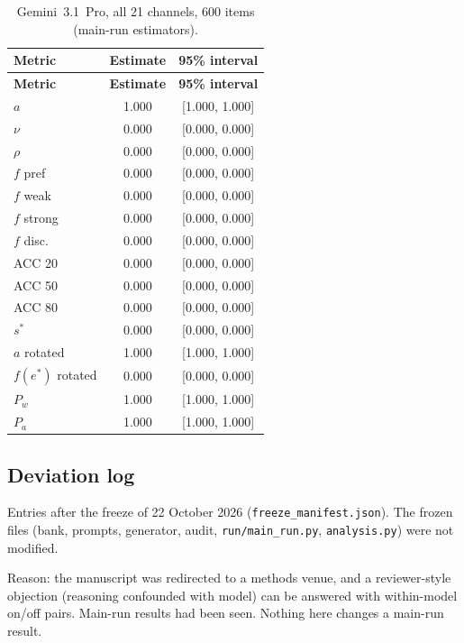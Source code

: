 \documentclass[10pt,a4paper]{article}
\begin{document}
\begin{footnotesize}
\setlength{\tabcolsep}{2pt}
\begin{longtable}{lcc}
\caption{Gemini~3.1~Pro, all 21 channels, 600 items (main-run estimators).}\\
\toprule
\textbf{Metric} & \textbf{Estimate} & \textbf{95\% interval} \\
\midrule
\endfirsthead
\toprule
\textbf{Metric} & \textbf{Estimate} & \textbf{95\% interval} \\
\midrule
\endhead
\bottomrule
\endfoot
$a$ & 1.000 & [1.000, 1.000] \\
$\nu$ & 0.000 & [0.000, 0.000] \\
$\rho$ & 0.000 & [0.000, 0.000] \\
$f$ pref & 0.000 & [0.000, 0.000] \\
$f$ weak & 0.000 & [0.000, 0.000] \\
$f$ strong & 0.000 & [0.000, 0.000] \\
$f$ disc. & 0.000 & [0.000, 0.000] \\
ACC 20 & 0.000 & [0.000, 0.000] \\
ACC 50 & 0.000 & [0.000, 0.000] \\
ACC 80 & 0.000 & [0.000, 0.000] \\
$s^{*}$ & 0.000 & [0.000, 0.000] \\
$a$ rotated & 1.000 & [1.000, 1.000] \\
$f(e^{*})$ rotated & 0.000 & [0.000, 0.000] \\
$P_w$ & 1.000 & [1.000, 1.000] \\
$P_a$ & 1.000 & [1.000, 1.000] \\
\end{longtable}
\end{footnotesize}

\subsection{Deviation log}
\noindent Entries after the freeze of 22 October 2026 (\texttt{freeze\_\allowbreak{}manifest.json}). The frozen files (bank, prompts, generator, audit, \texttt{run/\allowbreak{}main\_\allowbreak{}run.py}, \texttt{analysis.py}) were not modified.

\noindent Reason: the manuscript was redirected to a methods venue, and a reviewer-style objection (reasoning confounded with model) can be answered with within-model on/off pairs. Main-run results had been seen. Nothing here changes a main-run result.
\end{document}
